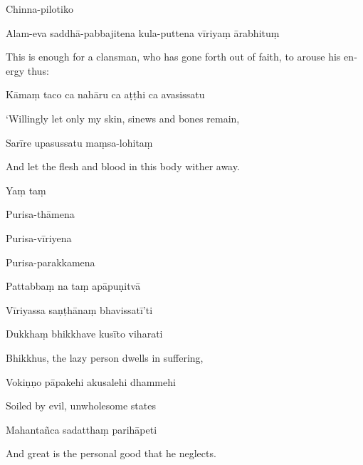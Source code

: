 
Chinna-pilotiko


Alam-eva saddhā-pabbajitena kula-puttena vīriyaṃ ārabhituṃ

\begin{english}
  This is enough for a clansman, who has gone forth out of faith,
  to arouse his energy thus:
\end{english}

Kāmaṃ taco ca nahāru ca aṭṭhi ca avasissatu

\begin{english}
  `Willingly let only my skin, sinews and bones remain,
\end{english}

Sarīre upasussatu maṃsa-lohitaṃ

\begin{english}
  And let the flesh and blood in this body wither away.
\end{english}

Yaṃ taṃ


Purisa-thāmena


Purisa-vīriyena


Purisa-parakkamena


Pattabbaṃ na taṃ apāpuṇitvā


Vīriyassa saṇṭhānaṃ bhavissatī'ti


Dukkhaṃ bhikkhave kusīto viharati

\begin{english}
  Bhikkhus, the lazy person dwells in suffering,
\end{english}

Vokiṇṇo pāpakehi akusalehi dhammehi

\begin{english}
  Soiled by evil, unwholesome states
\end{english}

Mahantañca sadatthaṃ parihāpeti

\begin{english}
  And great is the personal good that he neglects.
\end{english}

